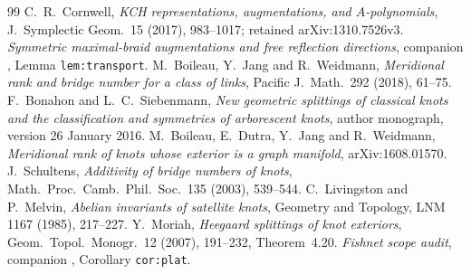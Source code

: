 \documentclass[11pt]{article}
\begin{document}
\begin{thebibliography}{99}
 C.~R.~Cornwell, \emph{KCH representations,
augmentations, and $A$-polynomials}, J.\ Symplectic Geom.\ 15 (2017),
983--1017; retained arXiv:1310.7526v3.
 \emph{Symmetric maximal-braid augmentations
and free reflection directions}, companion
,
Lemma \texttt{lem:transport}.
 M.~Boileau, Y.~Jang and R.~Weidmann,
\emph{Meridional rank and bridge number for a class of links},
Pacific J.\ Math.\ 292 (2018), 61--75.
 F.~Bonahon and L.~C.~Siebenmann,
\emph{New geometric splittings of classical knots and the
classification and symmetries of arborescent knots},
author monograph, version 26 January 2016.
 M.~Boileau, E.~Dutra, Y.~Jang and R.~Weidmann,
\emph{Meridional rank of knots whose exterior is a graph manifold},
arXiv:1608.01570.
 J.~Schultens, \emph{Additivity of bridge numbers
of knots}, Math.\ Proc.\ Camb.\ Phil.\ Soc.\ 135 (2003), 539--544.
 C.~Livingston and P.~Melvin, \emph{Abelian invariants
of satellite knots}, Geometry and Topology, LNM 1167 (1985), 217--227.
 Y.~Moriah, \emph{Heegaard splittings of knot
exteriors}, Geom.\ Topol.\ Monogr.\ 12 (2007), 191--232,
Theorem~4.20.
 \emph{Fishnet scope audit}, companion
, Corollary \texttt{cor:plat}.
\end{thebibliography}
\end{document}
